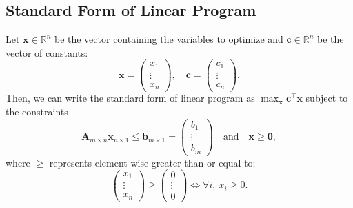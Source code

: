 \documentclass[twoside]{article}
\newcommand\R{\mathbb{R}}
\begin{document}
\subsection{Standard Form of Linear Program}
Let $\mathbf{x} \in \R^n$ be the vector containing the variables to optimize and
$\mathbf{c} \in \R^n$ be the vector of constants: \[
    \mathbf{x} = \begin{pmatrix} x_1 \\ \vdots \\ x_n \end{pmatrix},
    \quad
    \mathbf{c} = \begin{pmatrix} c_1 \\ \vdots \\ c_n \end{pmatrix}.
\] Then, we can write the standard form of linear program as
$\max_{\mathbf{x}} \mathbf{c}^\top \mathbf{x}$ subject to the constraints \[
    \mathbf{A}_{m \times n} \mathbf{x}_{n \times 1}
        \leq \mathbf{b}_{m \times 1}
        = \begin{pmatrix} b_1 \\ \vdots \\ b_m \end{pmatrix}
        \quad \text{and} \quad \mathbf{x} \ge \mathbf{0},
\] where $\geq$ represents element-wise greater than or equal to: \[
    \begin{pmatrix} x_1 \\ \vdots \\ x_n \end{pmatrix}
        \geq \begin{pmatrix} 0 \\ \vdots \\ 0 \end{pmatrix}
    \iff \forall i,\ x_i \geq 0.
\]
\end{document}
